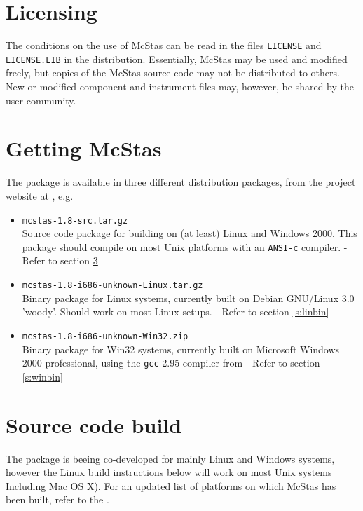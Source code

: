 \label{s:install}
\section{Licensing}
The conditions on the use of McStas can be read in the files
\verb+LICENSE+ and \verb+LICENSE.LIB+ in the distribution. Essentially,
McStas may be used and modified freely, but copies of the McStas source code 
may not be distributed to others. 
New or modified component and instrument files may, however, be shared by 
the user community.

\section{Getting McStas}
\label{s:obtain}
The  package is
available in three different distribution packages, from the project
website at
, e.g.
\begin{itemize}
\item{\texttt{mcstas-1.8-src.tar.gz}\\Source code package for
    building  on
    (at least) Linux and Windows 2000. This package should compile on
    most Unix platforms with an \texttt{ANSI-c} compiler. - Refer to section \ref{s:src}}
\item{\texttt{mcstas-1.8-i686-unknown-Linux.tar.gz}\\Binary package
  for Linux systems, currently built on Debian GNU/Linux 3.0 'woody'. 
  Should work on most Linux setups.
 - Refer to section \ref{s:linbin}}
\item{\texttt{mcstas-1.8-i686-unknown-Win32.zip}\\Binary package
  for Win32 systems, currently built on Microsoft Windows 2000
  professional, using the \texttt{gcc} 2.95 compiler from 
   - Refer to section \ref{s:winbin}}
\end{itemize}

\section{Source code build}
\label{s:src}
The  package is
beeing co-developed for mainly Linux and Windows systems, however 
the Linux build instructions below will work on most Unix
systems Including Mac OS X). For an updated list of platforms on which McStas has been
built, refer to the .

